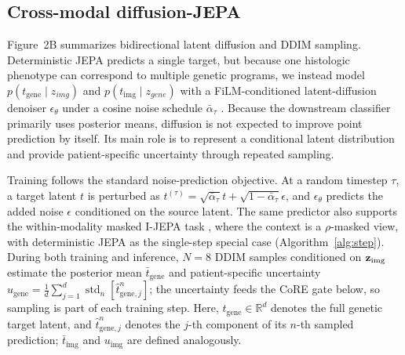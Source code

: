 \subsection{Cross-modal diffusion-JEPA}
\label{sec:diffusion}
Figure~2B summarizes bidirectional latent diffusion and DDIM sampling. Deterministic JEPA predicts a single target, but because one histologic phenotype can correspond to multiple genetic programs, we instead model $p(t_{\mathrm{gene}}\mid z_{img})$ and $p(t_{\mathrm{img}}\mid z_{gene})$ with a FiLM-conditioned \cite{perez2018film} latent-diffusion denoiser $\epsilon_\theta$ under a cosine noise schedule $\bar\alpha_\tau$ \cite{ho2020ddpm,nichol2021improved,song2021score}. Because the downstream classifier primarily uses posterior means,
diffusion is not expected to improve point prediction by itself.
Its main role is to represent a conditional latent distribution and
provide patient-specific uncertainty through repeated sampling.

Training follows the standard noise-prediction objective. At a random timestep
$\tau$, a target latent $t$ is perturbed as
$t^{(\tau)}=\sqrt{\bar\alpha_\tau}t+
\sqrt{1-\bar\alpha_\tau}\epsilon$, and $\epsilon_\theta$ predicts the added
noise $\epsilon$ conditioned on the source latent. The same predictor also supports the within-modality masked I-JEPA task \cite{assran2023ijepa}, where the context is a $\rho$-masked view, with deterministic JEPA as the single-step special case (Algorithm~\ref{alg:step}). During both training and inference, $N=8$ DDIM samples \cite{song2021ddim} conditioned on $\mathbf{z}_{\mathrm{img}}$ estimate the posterior mean $\bar t_{\mathrm{gene}}$ and patient-specific uncertainty $u_{\mathrm{gene}}=\tfrac{1}{d}\sum_{j=1}^{d}\operatorname{std}_{n}[\hat t_{\mathrm{gene},j}^{n}]$; the uncertainty feeds the CoRE gate below, so sampling is part of each training step. Here, $t_{\mathrm{gene}}\in\mathbb{R}^{d}$ denotes the full genetic target latent, and $\hat t_{\mathrm{gene},j}^{n}$ denotes the $j$-th component of its $n$-th sampled prediction; $\bar t_{\mathrm{img}}$ and $u_{\mathrm{img}}$ are defined analogously.


